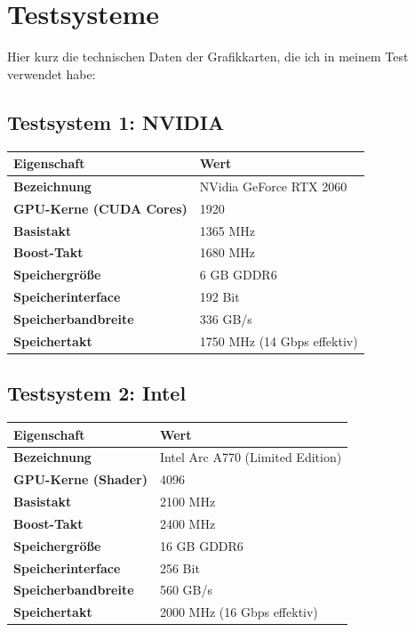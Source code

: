 \documentclass[12pt]{article}
\begin{document}
	\section*{Testsysteme}
	Hier kurz die technischen Daten der Grafikkarten, die ich in meinem Test verwendet habe:
	
	\subsection*{Testsystem 1: NVIDIA}
	\begin{tabular}{@{}ll@{}}
		\toprule
		\textbf{Eigenschaft}             & \textbf{Wert}                      \\ \midrule
		\textbf{Bezeichnung}			& NVidia GeForce RTX 2060			\\
		\textbf{GPU-Kerne (CUDA Cores)} & 1920                               \\
		\textbf{Basistakt}              & 1365 MHz                           \\
		\textbf{Boost-Takt}             & 1680 MHz                           \\
		\textbf{Speichergröße}          & 6 GB GDDR6                         \\
		\textbf{Speicherinterface}      & 192 Bit                            \\
		\textbf{Speicherbandbreite}     & 336 GB/s                           \\
		\textbf{Speichertakt}           & 1750 MHz (14 Gbps effektiv)        \\
		\bottomrule
	\end{tabular}
	
	\subsection*{Testsystem 2: Intel}
	\begin{tabular}{@{}ll@{}}
		\toprule
		\textbf{Eigenschaft}             & \textbf{Wert}                         \\ \midrule
		\textbf{Bezeichnung}		     & Intel Arc A770 (Limited Edition)		\\
		\textbf{GPU-Kerne (Shader)}      & 4096                                   \\
		\textbf{Basistakt}               & 2100 MHz                              \\
		\textbf{Boost-Takt}              & 2400 MHz                       		\\
		\textbf{Speichergröße}           & 16 GB GDDR6                           \\
		\textbf{Speicherinterface}       & 256 Bit                               \\
		\textbf{Speicherbandbreite}      & 560 GB/s                              \\
		\textbf{Speichertakt}            & 2000 MHz (16 Gbps effektiv)            \\
		\bottomrule
	\end{tabular}
	
\end{document}
